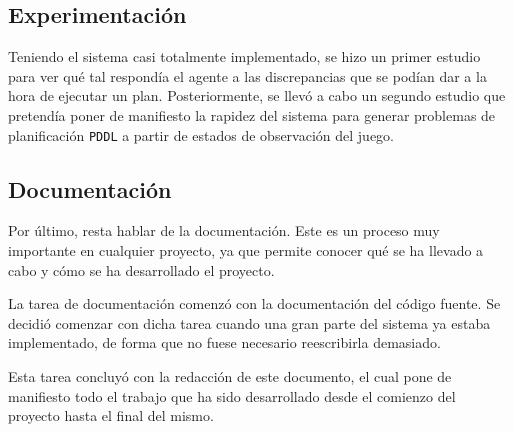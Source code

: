 \subsection{Experimentación}

Teniendo el sistema casi totalmente implementado, se hizo un primer estudio para ver qué tal respondía
el agente a las discrepancias que se podían dar a la hora de ejecutar un plan. Posteriormente, se llevó
a cabo un segundo estudio que pretendía poner de manifiesto la rapidez del sistema para generar problemas
de planificación \texttt{PDDL} a partir de estados de observación del juego.

\subsection{Documentación}

Por último, resta hablar de la documentación. Este es un proceso muy importante en cualquier
proyecto, ya que permite conocer qué se ha llevado a cabo y cómo se ha desarrollado el proyecto.

La tarea de documentación comenzó con la documentación del código fuente. Se decidió comenzar
con dicha tarea cuando una gran parte del sistema ya estaba implementado, de forma que no fuese
necesario reescribirla demasiado.

Esta tarea concluyó con la redacción de este documento, el cual pone de manifiesto todo el trabajo
que ha sido desarrollado desde el comienzo del proyecto hasta el final del mismo.
